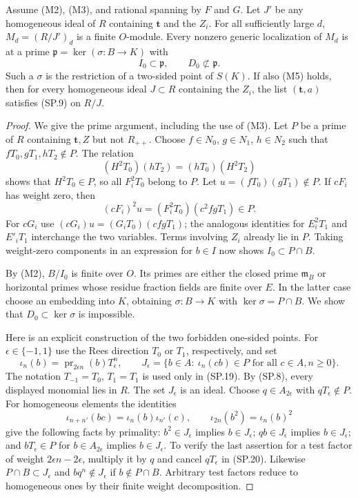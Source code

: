 \begin{lemma}
\label{claim:SP3}
Assume (M2), (M3), and rational spanning by $F$ and $G$.
Let $J'$ be any homogeneous ideal of $R$ containing $\mathbf t$
and the $Z_i$.  For all sufficiently large $d$,
$M_d=(R/J')_d$ is a finite $O$-module.  Every nonzero generic
localization of $M_d$ is at a prime
$\mathfrak p=\ker(\sigma:B\to K)$ with
\[
                     I_0\subset\mathfrak p,
                     \qquad D_0\not\subset\mathfrak p.
 \tag{SP.17}
\]
Such a $\sigma$ is the restriction of a two-sided point of $S(K)$.
If also (M5) holds, then for every homogeneous ideal $J\subset R$ containing
the $Z_i$, the list $(\mathbf t,a)$ satisfies (SP.9) on $R/J$.
\end{lemma}

\begin{proof}
We give the prime argument, including the use of (M3).  Let $P$ be a
prime of $R$ containing $\mathbf t,Z$ but not $R_{++}$.  Choose
$f\in N_0$, $g\in N_1$, $h\in N_2$ such that
$fT_0,gT_1,hT_2\notin P$.  The relation
\[
             (H^2T_0)(hT_2)=(hT_0)(H^2T_2)
 \tag{SP.18}
\]
shows that $H^2T_0\in P$, so all $F_i^2T_0$ belong to $P$.
Let $u=(fT_0)(gT_1)\notin P$.  If $cF_i$ has weight zero, then
\[
              (cF_i)^2u=(F_i^2T_0)(c^2fgT_1)\in P.
\]
For $cG_i$ use $(cG_i)u=(G_iT_0)(cfgT_1)$; the analogous identities
for $E_i^2T_1$ and $E'_iT_1$ interchange the two variables.  Terms
involving $Z_i$ already lie in $P$.  Taking weight-zero components
in an expression for $b\in I$ now shows $I_0\subset P\cap B$.

By (M2), $B/I_0$ is finite over $O$.  Its primes are either the
closed prime $\mathfrak m_B$ or horizontal primes whose residue
fraction fields are finite over $E$.  In the latter case choose an
embedding into $K$, obtaining $\sigma:B\to K$ with
$\ker\sigma=P\cap B$.  We show that $D_0\subset\ker\sigma$ is
impossible.

Here is an explicit construction of the two forbidden one-sided
points.  For $\epsilon\in\{-1,1\}$ use the Rees direction $T_0$
or $T_1$, respectively, and set
\[
 \iota_n(b)=\operatorname{pr}_{2\epsilon n}(b)T_\epsilon^n,
 \qquad
 J_\epsilon=\{b\in A:\ \iota_n(cb)\in P
                         \text{ for all }c\in A,n\ge0\}.
 \tag{SP.19}
\]
The notation $T_{-1}=T_0$, $T_1=T_1$ is used only in (SP.19).
By (SP.8), every displayed monomial lies in $R$.
The set $J_\epsilon$ is an ideal.  Choose $q\in A_{2\epsilon}$
with $qT_\epsilon\notin P$.  For homogeneous elements the identities
\[
 \iota_{n+n'}(bc)=\iota_n(b)\iota_{n'}(c),\qquad
 \iota_{2n}(b^2)=\iota_n(b)^2
 \tag{SP.20}
\]
give the following facts by primality: $b^2\in J_\epsilon$ implies
$b\in J_\epsilon$; $qb\in J_\epsilon$ implies
$b\in J_\epsilon$; and $bT_\epsilon\in P$ for
$b\in A_{2\epsilon}$ implies $b\in J_\epsilon$.
To verify the last assertion for a test factor of weight
$2\epsilon n-2\epsilon$, multiply it by $q$ and cancel
$qT_\epsilon$ in (SP.20).  Likewise
$P\cap B\subset J_\epsilon$ and
$bq^n\notin J_\epsilon$ if $b\notin P\cap B$.
Arbitrary test factors reduce to homogeneous ones by their finite
weight decomposition.


\end{proof}
